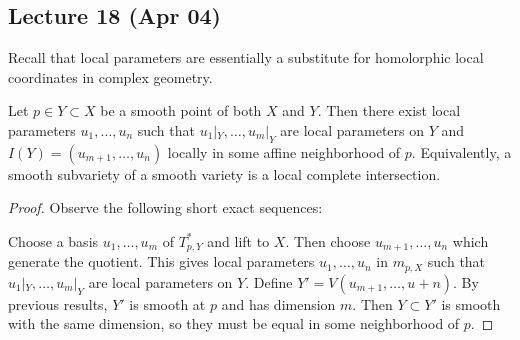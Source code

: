 \documentclass[twoside, 10pt]{article}
\begin{document}
    \subsection{Lecture 18 (Apr 04)}
    Recall that local parameters are essentially a substitute for homolorphic local coordinates in complex geometry. 

    \begin{lem}
        Let $p \in Y \subset X$ be a smooth point of both $X$ and $Y$. Then there exist local parameters $u_1, \ldots, u_n$ such that $u_1|_Y, \ldots, u_m|_Y$ are local parameters on $Y$ and $I(Y) = (u_{m+1}, \ldots, u_n)$ locally in some affine neighborhood of $p$. Equivalently, a smooth subvariety of a smooth variety is a local complete intersection.
        \begin{proof}
            Observe the following short exact sequences:
            \begin{center}
            \end{center}
            Choose a basis $u_1, \ldots, u_m$ of $T_{p,Y}^*$ and lift to $X$. Then choose $u_{m+1}, \ldots, u_n$ which generate the quotient. This gives local parameters $u_1, \ldots, u_n$ in $m_{p,X}$ such that $u_1|_Y, \ldots, u_m|_Y$ are local parameters on $Y$. Define $Y' = V(u_{m+1}, \ldots, u+n)$. By previous results, $Y'$ is smooth at $p$ and has dimension $m$. Then $Y \subset Y'$ is smooth with the same dimension, so they must be equal in some neighborhood of $p$.
        \end{proof}
    \end{lem}
\end{document}

